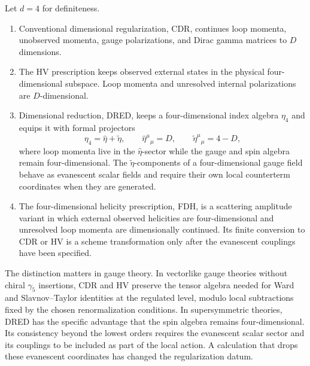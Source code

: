 \begin{definition}
Let \(d=4\) for definiteness.
\begin{enumerate}
\item Conventional dimensional regularization, CDR, continues loop momenta,
unobserved momenta, gauge polarizations, and Dirac gamma matrices to \(D\)
dimensions.
\item The HV prescription keeps observed external states in the physical
four-dimensional subspace.  Loop momenta and unresolved internal polarizations
are \(D\)-dimensional.
\item Dimensional reduction, DRED, keeps a four-dimensional index algebra
\(\eta_4\) and equips it with formal projectors
\[
  \eta_4=\hat\eta+\tilde\eta,\qquad
  \hat\eta^\mu{}_\mu=D,\qquad
  \tilde\eta^\mu{}_\mu=4-D ,
\]
where loop momenta live in the \(\hat\eta\)-sector while the gauge and spin
algebra remain four-dimensional.  The \(\tilde\eta\)-components of a
four-dimensional gauge field behave as evanescent scalar fields and require
their own local counterterm coordinates when they are generated.
\item The four-dimensional helicity prescription, FDH, is a scattering
amplitude variant in which external observed helicities are four-dimensional
and unresolved loop momenta are dimensionally continued.  Its finite
conversion to CDR or HV is a scheme transformation only after the evanescent
couplings have been specified.
\end{enumerate}
\end{definition}

The distinction matters in gauge theory.  In vectorlike gauge theories without
chiral \(\gamma_5\) insertions, CDR and HV preserve the tensor algebra needed
for Ward and Slavnov--Taylor identities at the regulated level, modulo local
subtractions fixed by the chosen renormalization conditions.  In
supersymmetric theories, DRED has the specific advantage that the spin algebra
remains four-dimensional.  Its consistency beyond the lowest orders requires
the evanescent scalar sector and its couplings to be included as part of the
local action.  A calculation that drops these evanescent coordinates has
changed the regularization datum.

